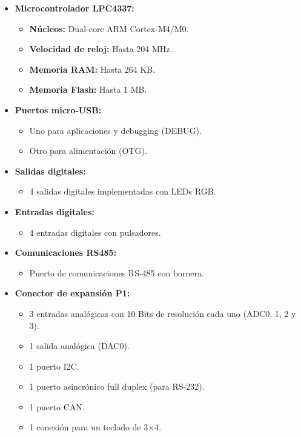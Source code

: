 \begin{itemize}[leftmargin=*]

  \item \textbf{Microcontrolador LPC4337:}
    \begin{itemize}[label=-]
      \item \textbf{Núcleos:} Dual-core ARM Cortex-M4/M0.
      \item \textbf{Velocidad de reloj:} Hasta 204 MHz.
      \item \textbf{Memoria RAM:} Hasta 264 KB.
      \item \textbf{Memoria Flash:} Hasta 1 MB.
    \end{itemize}

  \item \textbf{Puertos micro-USB:}
    \begin{itemize}[label=-]
      \item Uno para aplicaciones y debugging (DEBUG).
      \item Otro para alimentación (OTG).
    \end{itemize}
  
  \item \textbf{Salidas digitales:}
    \begin{itemize}[label=-]
      \item 4 salidas digitales implementadas con LEDs RGB.
    \end{itemize}
  
  \item \textbf{Entradas digitales:}
    \begin{itemize}[label=-]
      \item 4 entradas digitales con pulsadores.
    \end{itemize}
  
  \item \textbf{Comunicaciones RS485:}
    \begin{itemize}[label=-]
      \item Puerto de comunicaciones RS-485 con bornera.
    \end{itemize}
  
  \item \textbf{Conector de expansión P1:}
    \begin{itemize}[label=-]
      \item 3 entradas analógicas con 10 Bits de resolución cada uno (ADC0, 1, 2 y 3).
      \item 1 salida analógica (DAC0).
      \item 1 puerto I2C.
      \item 1 puerto asincrónico full duplex (para RS-232).
      \item 1 puerto CAN.
      \item 1 conexión para un teclado de 3×4.
    \end{itemize}
  

\end{itemize}

